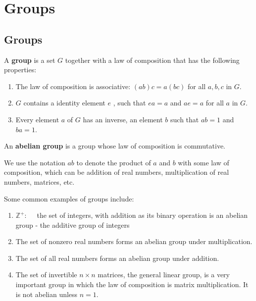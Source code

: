 \documentclass[main.tex]{subfiles}
\begin{document}
\chapter{Groups}
\section{Groups}
\begin{definition}
A \textbf{group} is a set $G$ together with a law of composition that has the following properties:
\begin{enumerate}
    \item The law of composition is associative: $(a b) c=a(b c)$ for all $a, b, c$ in $G$.
    \item $G$ contains a identity element $e$ , such that $ea=a$ and $ae=a$ for all $a$ in $G$.
    \item Every element $a$ of $G$ has an inverse, an element $b$ such that $a b=1$ and $b a=1$.
\end{enumerate}

An \textbf{abelian group} is a group whose law of composition is commutative.

We use the notation $ab$ to denote the product of $a$ and $b$ with some law of composition, which can be addition of real numbers, multiplication of real numbers, matrices, etc. 


\end{definition}
\begin{example}
Some common examples of groups include: 
\begin{enumerate}
    \item $\mathbb{Z}^{+}: \quad$ the set of integers, with addition as its binary operation is an abelian group - the additive group of integers
    \item The set of nonzero real numbers forms an abelian group under multiplication.
    \item The set of all real numbers forms an abelian group under addition.
    \item The set of invertible $n \times n$ matrices, the general linear group, is a very important group in which the law of composition is matrix multiplication. It is not abelian unless $n=1$.
\end{enumerate}  
\end{example}
\end{document}
